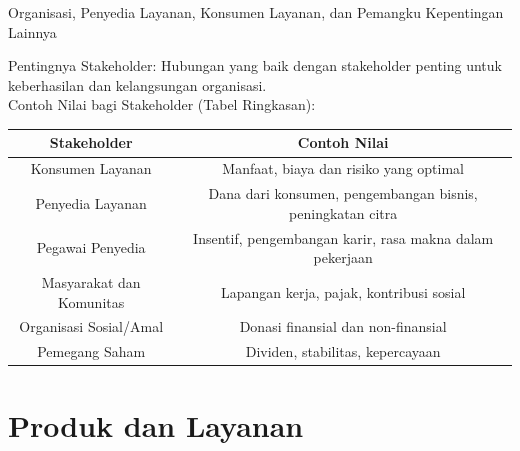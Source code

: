 \documentclass[aspectratio=179]{beamer}
\begin{document}
\begin{frame}{Organisasi, Penyedia Layanan, Konsumen Layanan, dan Pemangku Kepentingan Lainnya}
    \begin{block}{Pentingnya Stakeholder:}
        {Hubungan yang baik dengan stakeholder penting untuk keberhasilan dan kelangsungan organisasi.\\
        Contoh Nilai bagi Stakeholder (Tabel Ringkasan):\\
        }
        \begin{tabular}{|c|c|}
        \hline 
        \textbf{Stakeholder} & \textbf{Contoh Nilai} \\ \hline
        Konsumen Layanan & Manfaat, biaya dan risiko yang optimal  \\ \hline
        Penyedia Layanan & Dana dari konsumen, pengembangan bisnis, peningkatan citra    \\ \hline
        Pegawai Penyedia &  Insentif, pengembangan karir, rasa makna dalam pekerjaan    \\ \hline
        Masyarakat dan Komunitas & Lapangan kerja, pajak, kontribusi sosial \\ \hline
        Organisasi Sosial/Amal & Donasi finansial dan non-finansial \\ \hline
        Pemegang Saham & Dividen, stabilitas, kepercayaan \\ \hline
        \end{tabular}
    \end{block}
\end{frame}

\section{Produk dan Layanan}
\end{document}
